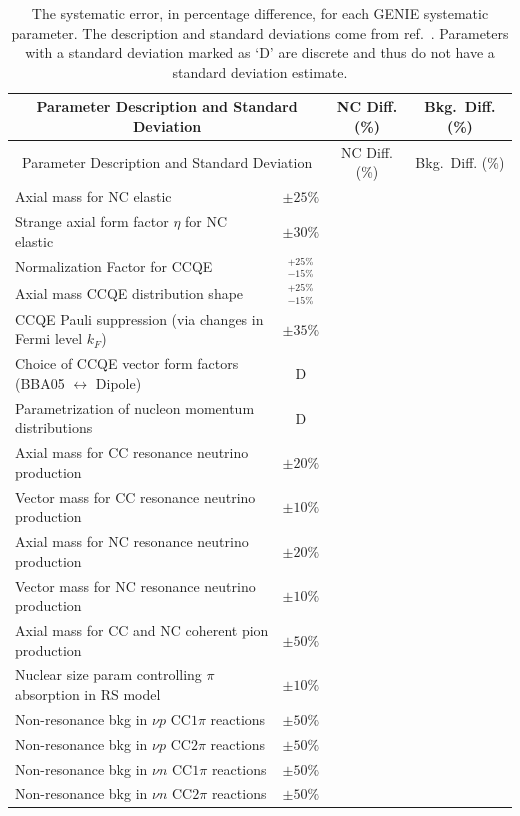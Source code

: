 \singlespacing
\begin{longtable}{l c c c}
  \caption[GENIE Systematic Errors]{The systematic error, in percentage difference, for each GENIE systematic parameter. The description and standard deviations come from ref.~\cite{ref:GENIE}. Parameters with a standard deviation marked as `D' are discrete and thus do not have a standard deviation estimate.} \tabularnewline
  \hline\hline
  \multicolumn{2}{c}{Parameter Description and Standard Deviation} & NC Diff. (\%) & Bkg.~Diff. (\%) \\
  \hline \endfirsthead
  \hline\hline
  \multicolumn{2}{c}{Parameter Description and Standard Deviation} & NC Diff. (\%) & Bkg.~Diff. (\%) \\
  \hline \endhead
  Axial mass for NC elastic & $\pm25\%$ & & \\
  Strange axial form factor $\eta$ for NC elastic & $\pm30\%$ & & \\
  Normalization Factor for CCQE & $^{+25\%}_{-15\%}$ & & \\
  Axial mass CCQE distribution shape & $^{+25\%}_{-15\%}$ & & \\
  CCQE Pauli suppression (via changes in Fermi level $k_F$) & $\pm35\%$ & & \\
  Choice of CCQE vector form factors (BBA05 $\leftrightarrow$ Dipole) & D & & \\
  Parametrization of nucleon momentum distributions & D & & \\ %
  Axial mass for CC resonance neutrino production & $\pm20\%$ & & \\
  Vector mass for CC resonance neutrino production & $\pm10\%$ & & \\
  Axial mass for NC resonance neutrino production & $\pm20\%$ & & \\
  Vector mass for NC resonance neutrino production & $\pm10\%$ & & \\
  Axial mass for CC and NC coherent pion production & $\pm50\%$ & & \\
  Nuclear size param controlling $\pi$ absorption in RS model & $\pm10\%$ & & \\
  Non-resonance bkg in $\nu p$ CC$1\pi$ reactions & $\pm50\%$ & & \\
  Non-resonance bkg in $\nu p$ CC$2\pi$ reactions & $\pm50\%$ & & \\
  Non-resonance bkg in $\nu n$ CC$1\pi$ reactions & $\pm50\%$ & & \\
  Non-resonance bkg in $\nu n$ CC$2\pi$ reactions & $\pm50\%$ & & \\

\end{longtable}
